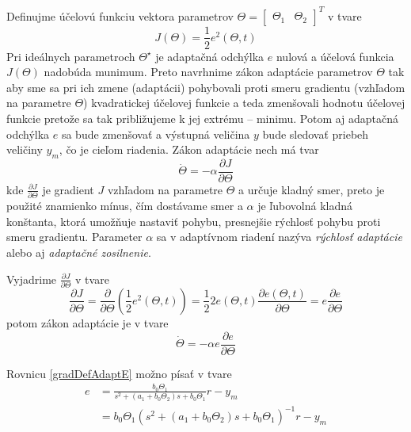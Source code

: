\documentclass[a4paper, 10pt, ]{article}
\begin{document}
Definujme účelovú funkciu vektora parametrov  $\Theta = \begin{bmatrix} \Theta_1 & \Theta_2  \end{bmatrix}^{T}$ v tvare
\begin{equation}
	J(\Theta) = \frac{1}{2}e^2(\Theta,t)
\end{equation}
Pri ideálnych parametroch $\Theta^\star$ je adaptačná odchýlka $e$ nulová a účelová funkcia $J(\Theta)$ nadobúda munimum. Preto navrhnime zákon adaptácie parametrov $\Theta$ tak aby sme sa pri ich zmene (adaptácii) pohybovali proti smeru gradientu (vzhľadom na parametre $\Theta$) kvadratickej účelovej funkcie a teda zmenšovali hodnotu účelovej funkcie pretože sa tak približujeme k jej extrému -- minimu. Potom aj adaptačná odchýlka $e$ sa bude zmenšovať a výstupná veličina $y$ bude sledovať priebeh veličiny $y_m$, čo je cieľom riadenia. Zákon adaptácie nech má tvar
\begin{equation}
	\dot\Theta
	=
	- \alpha
	\frac{\partial J}{\partial \Theta}
\end{equation}
kde $\frac{\partial J}{\partial\Theta}$ je gradient $J$ vzhľadom na parametre $\Theta$ a určuje kladný smer, preto je použité znamienko mínus, čím dostávame smer  a $\alpha$ je ľubovolná kladná konštanta, ktorá umožňuje nastaviť  pohybu, presnejšie rýchlosť pohybu proti smeru gradientu. Parameter $\alpha$ sa v adaptívnom riadení nazýva \emph{rýchlosť adaptácie} alebo aj \emph{adaptačné zosilnenie}.




Vyjadrime $\frac{\partial J}{\partial\Theta}$ v tvare
\begin{equation}
	\frac{\partial J}{\partial \Theta}
	= \frac{\partial}{\partial \Theta} \left( \frac{1}{2}e^2(\Theta,t) \right)
	= \frac{1}{2} 2 e(\Theta,t) \frac{\partial e(\Theta,t)}{\partial \Theta}
	= e \frac{\partial e}{\partial \Theta}
\end{equation}
potom zákon adaptácie je v tvare
\begin{equation}
	\dot\Theta = - \alpha e \frac{\partial e}{\partial \Theta}
\end{equation}

Rovnicu \eqref{gradDefAdaptE} možno písať v tvare
\begin{equation} \label{gradAdaptE}
\begin{split}
	e &= \frac{b_0 \Theta_1}{s^2 + \left(a_1 + b_0 \Theta_2 \right) s + b_0 \Theta_1} r - y_m \\
	&= b_0 \Theta_1
	\left(
		s^2 + \left(a_1 + b_0 \Theta_2 \right) s + b_0 \Theta_1
	\right)^{-1}
	r - y_m
	\end{split}
\end{equation}
\end{document}
